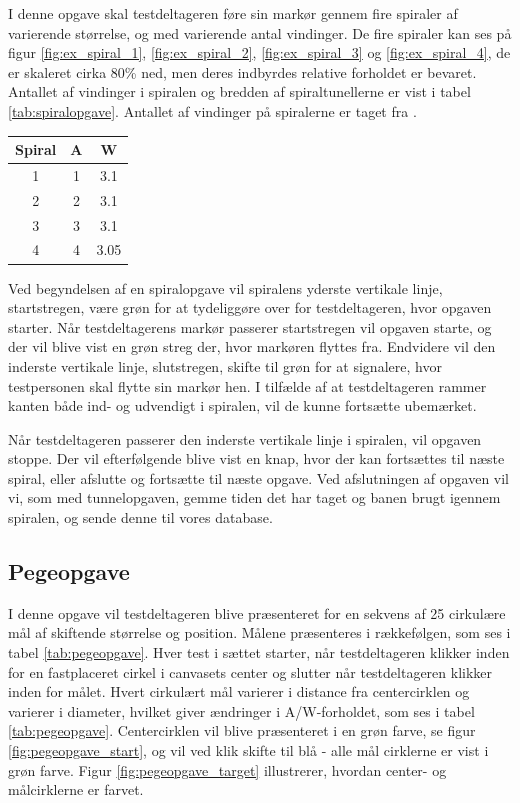 I denne opgave skal testdeltageren føre sin markør gennem fire spiraler af varierende størrelse, og med varierende antal vindinger. De fire spiraler kan ses på figur \ref{fig:ex_spiral_1}, \ref{fig:ex_spiral_2}, \ref{fig:ex_spiral_3} og \ref{fig:ex_spiral_4}, de er skaleret cirka 80\% ned, men deres indbyrdes relative forholdet er bevaret. Antallet af vindinger i spiralen og bredden af spiraltunellerne er vist i tabel \ref{tab:spiralopgave}. Antallet af vindinger på spiralerne er taget fra \cite{accot1997}.
\begin{center}
	\begin{tabular}{c c c}
		Spiral & A & W \\
		\hline
		1 & 1 & 3.1 \\
		2 & 2 & 3.1\\
		3 & 3 & 3.1\\
		4 & 4 & 3.05\\
	\end{tabular}
	\label{tab:spiralopgave}
\end{center}
Ved begyndelsen af en spiralopgave vil spiralens yderste vertikale linje, startstregen, være grøn for at tydeliggøre over for testdeltageren, hvor opgaven starter. Når testdeltagerens markør passerer startstregen vil opgaven starte, og der vil blive vist en grøn streg der, hvor markøren flyttes fra. Endvidere vil den inderste vertikale linje, slutstregen, skifte til grøn for at signalere, hvor testpersonen skal flytte sin markør hen. I tilfælde af at testdeltageren rammer kanten både ind- og udvendigt i spiralen, vil de kunne fortsætte ubemærket.

Når testdeltageren passerer den inderste vertikale linje i spiralen, vil opgaven stoppe. Der vil efterfølgende blive vist en knap, hvor der kan fortsættes til næste spiral, eller afslutte og fortsætte til næste opgave. Ved afslutningen af opgaven vil vi, som med tunnelopgaven, gemme tiden det har taget og banen brugt igennem spiralen, og sende denne til vores database.

\subsection*{Pegeopgave}
I denne opgave vil testdeltageren blive præsenteret for en sekvens af 25 cirkulære mål af skiftende størrelse og position. Målene præsenteres i rækkefølgen, som ses i tabel \ref{tab:pegeopgave}. Hver test i sættet starter, når testdeltageren klikker inden for en fastplaceret cirkel i canvasets center og slutter når testdeltageren klikker inden for målet. Hvert cirkulært mål varierer i distance fra centercirklen og varierer i diameter, hvilket giver ændringer i A/W-forholdet, som ses i tabel \ref{tab:pegeopgave}. Centercirklen vil blive præsenteret i en grøn farve, se figur \ref{fig:pegeopgave_start}, og vil ved klik skifte til blå - alle mål cirklerne er vist i grøn farve. Figur \ref{fig:pegeopgave_target} illustrerer, hvordan center- og målcirklerne er farvet. 


